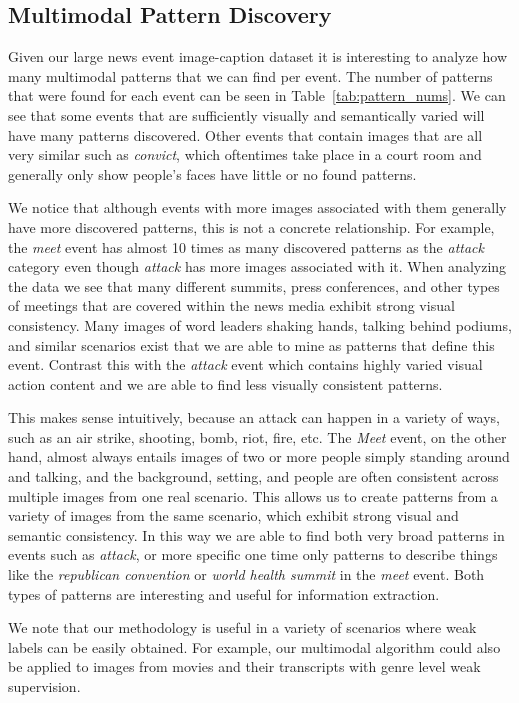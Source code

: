 \documentclass[10pt,twocolumn,letterpaper]{article}
\begin{document}
{\subsection{Multimodal Pattern Discovery}
Given our large news event image-caption dataset it is interesting to analyze how many multimodal patterns that we can find per event.
The number of patterns that were found for each event can be seen in Table~\ref{tab:pattern_nums}.
We can see that some events that are sufficiently visually and semantically varied will have many patterns discovered.
Other events that contain images that are all very similar such as {\it convict}, which oftentimes take place in a court room and generally only show people's faces have little or no found patterns.

We notice that although events with more images associated with them generally have more discovered patterns, this is not a concrete relationship.
For example, the {\it meet} event has almost 10 times as many discovered patterns as the {\it attack} category even though {\it attack} has more images associated with it.
When analyzing the data we see that many different summits, press conferences, and other types of meetings that are covered within the news media exhibit strong visual consistency.
Many images of word leaders shaking hands, talking behind podiums, and similar scenarios exist that we are able to mine as patterns that define this event.
Contrast this with the {\it attack} event which contains highly varied visual action content and we are able to find less visually consistent patterns.

This makes sense intuitively, because an attack can happen in a variety of ways, such as an air strike, shooting, bomb, riot, fire, etc.
The {\it Meet} event, on the other hand, almost always entails images of two or more people simply standing around and talking, and the background, setting, and people are often consistent across multiple images from one real scenario.
This allows us to create patterns from a variety of images from the same scenario, which exhibit strong visual and semantic consistency.
In this way we are able to find both very broad patterns in events such as {\it attack}, or more specific one time only patterns to describe things like the {\it republican convention} or {\it world health summit} in the {\it meet} event.
Both types of patterns are interesting and useful for information extraction.

We note that our methodology is useful in a variety of scenarios where weak labels can be easily obtained.
For example, our multimodal algorithm could also be applied to images from movies and their transcripts with genre level weak supervision.

}
\end{document}
